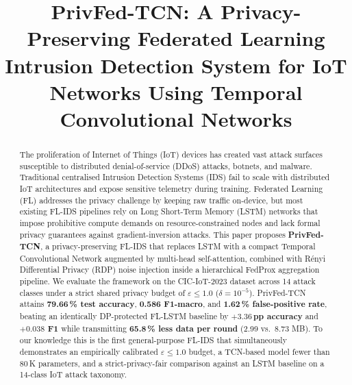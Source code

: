 \documentclass[conference]{IEEEtran}
\newcommand{\eps}{\varepsilon}
\begin{document}
\title{PrivFed-TCN: A Privacy-Preserving Federated Learning Intrusion
       Detection System for IoT Networks Using Temporal Convolutional
       Networks}

\author{
  \and
}

\maketitle

\begin{abstract}
The proliferation of Internet of Things (IoT) devices has created vast
attack surfaces susceptible to distributed denial-of-service (DDoS)
attacks, botnets, and malware. Traditional centralised Intrusion
Detection Systems (IDS) fail to scale with distributed IoT
architectures and expose sensitive telemetry during training. Federated
Learning (FL) addresses the privacy challenge by keeping raw traffic
on-device, but most existing FL-IDS pipelines rely on Long
Short-Term Memory (LSTM) networks that impose prohibitive compute
demands on resource-constrained nodes and lack formal privacy
guarantees against gradient-inversion attacks.
This paper proposes \textbf{PrivFed-TCN}, a privacy-preserving FL-IDS
that replaces LSTM with a compact Temporal Convolutional Network
augmented by multi-head self-attention, combined with R\'enyi
Differential Privacy (RDP) noise injection inside a hierarchical
FedProx aggregation pipeline. We evaluate the framework on the
CIC-IoT-2023 dataset across 14 attack classes under a strict shared
privacy budget of $\eps\!\le\!1.0$ ($\delta\!=\!10^{-5}$).
PrivFed-TCN attains \textbf{79.66\,\% test accuracy}, \textbf{0.586
F1-macro}, and \textbf{1.62\,\% false-positive rate}, beating an
identically DP-protected FL-LSTM baseline by \textbf{$+3.36$\,pp
accuracy} and \textbf{$+0.038$ F1} while transmitting \textbf{65.8\,\%
less data per round} (2.99 vs.\ 8.73 MB). To our knowledge this is the
first general-purpose FL-IDS that simultaneously demonstrates an
empirically calibrated $\eps\!\le\!1.0$ budget, a TCN-based model
fewer than 80\,K parameters, and a strict-privacy-fair comparison
against an LSTM baseline on a 14-class IoT attack taxonomy.
\end{abstract}
\end{document}
